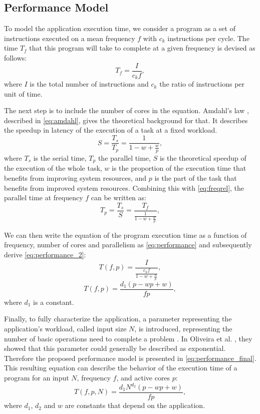 \subsection{Performance Model} \label{sec:performancemodel}
To model the application execution time, we consider a program as a set of instructions executed on a mean frequency $f$ with $c_k$ instructions per cycle. The time $T_f$ that this program will take to complete at a given frequency is devised as follows:
\begin{equation}
T_f=\frac{I}{c_kf},
\label{eq:freqrel}
\end{equation}
where $I$ is the total number of instructions and $c_k$ the ratio of instructions per unit of time.

The next step is to include the number of cores in the equation. Amdahl's law \cite{Amdahl1967ValidityCapabilities}, described in \cref{eq:amdahl}, gives the theoretical background for that. It describes the speedup in latency of the execution of a task at a fixed workload.
\begin{equation}
S=\frac{T_s}{T_p}=\frac{1}{1-w+\frac{w}{p}},
\label{eq:amdahl}
\end{equation}
where $T_s$ is the serial time, $T_p$ the parallel time, $S$ is the theoretical speedup of the execution of the whole task, $w$ is the proportion of the execution time that benefits from improving system resources, and $p$ is the part of the task that benefits from improved system resources. Combining this with \cref{eq:freqrel}, the parallel time at frequency $f$ can be written as:
\begin{equation}
T_p=\frac{T_s}{S}=\frac{T_f}{\frac{1}{1-w+\frac{w}{p}}},
\label{eq:parallel_time}
\end{equation}

We can then write the equation of the program execution time as a function of frequency, number of cores and parallelism  as \cref{eq:performance} and subsequently derive \cref{eq:performance_2}:
\begin{equation}
T(f,p)=\frac{I}{ \frac{c_kf}{1-w+\frac{w}{p}} },
\label{eq:performance}
\end{equation}
\begin{equation}
T(f,p)=\frac{d_1(p-wp+w)}{fp},
\label{eq:performance_2}
\end{equation}
where $d_1$ is a constant.

Finally, to fully characterize the application, a parameter representing the application's workload, called input size $N$, is introduced, representing the number of basic operations need to complete a problem \cite{Kumar1994AnalyzingArchitectures}. In Oliveira et al. \cite{Oliveira2018ApplicationCores}, they showed that this parameter could generally be described as exponential. Therefore the proposed performance model is presented in \cref{eq:performance_final}. This resulting equation can describe the behavior of the execution time of a program for an input $N$, frequency $f$, and active cores $p$:
\begin{equation}
T(f,p,N)=\frac{d_1N^{d_2}(p-wp+w)}{fp},
\label{eq:performance_final}
\end{equation}
where $d_1$, $d_2$ and $w$ are constants that depend on the application. 

